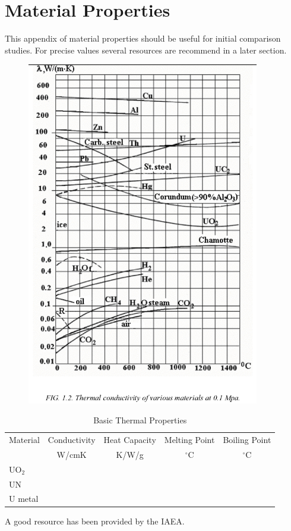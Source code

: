 \chapter*{Material Properties}
This appendix of material properties should be useful for initial comparison studies. For precise values several resources are recommend in a later section.


\begin{figure}[htbp]
  \centering
  \includegraphics[width=4in]{graphics/thermal-k.png}  
\end{figure}



\begin{table}
  \centering
  \caption{Basic Thermal Properties\cite{IAEA_1}}
  \begin{tabular}{lcccc}
    \toprule  
    Material & Conductivity & Heat Capacity & Melting Point & Boiling Point\\
             & W/cmK &         K/W/g &        $^{\circ}$C  &   $^{\circ}$C \\
    \midrule    
    UO$_2$ & \\
    UN & \\
    U metal & \\
    \bottomrule
  \end{tabular}

\end{table}


A good resource has been provided by the IAEA\cite{IAEA_1}.


\begingroup
\let\cleardoublepage\clearpage





\endgroup
